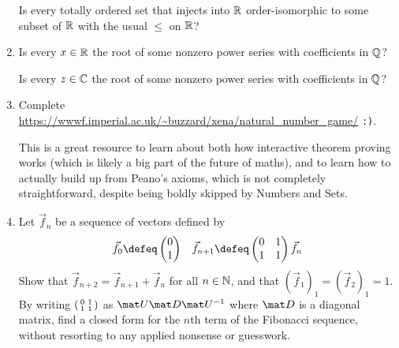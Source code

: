 \documentclass[a4paper,12pt]{article}
\begin{document}
\begin{enumerate}[leftmargin=*]
  Is every totally ordered set that injects into \(\mathbb R\) order-isomorphic to some
  subset of \(\mathbb R\) with the usual \(\le\) on \(\mathbb R\)?
 \item
  Is every \(x \in \mathbb R\) the root of some nonzero power series with coefficients
  in \(\mathbb Q\)?

  Is every \(z \in \mathbb C\) the root of some nonzero power series with coefficients
  in \(\mathbb Q\)?
 \item
  Complete \url{https://wwwf.imperial.ac.uk/~buzzard/xena/natural_number_game/}
  \texttt{:)}.

  This is a great resource to learn about both how interactive theorem proving
  works (which is likely a big part of the future of maths), and to learn how
  to actually build up from Peano's axioms, which is not completely
  straightforward, despite being boldly skipped by Numbers and Sets.
 \item
  Let \(\vec f_n\) be a sequence of vectors defined by
  \begin{align*}
   \vec f_0 \defeq
    \begin{pmatrix} 0 \\ 1 \end{pmatrix}
   &&
   \vec f_{n + 1} \defeq
    \begin{pmatrix} 0 & 1 \\ 1 & 1 \end{pmatrix}\vec f_n
  \end{align*}
  Show that
  \(\vec f_{n + 2} = \vec f_{n + 1} + \vec f_n\) for all
  \(n \in \mathbb N\), and that \((\vec f_1)_1 = (\vec f_2)_1 = 1\). By
  writing \(\begin{psmallmatrix} 0 & 1 \\ 1 & 1 \end{psmallmatrix}\) as
  \(\mat U \mat D \mat U^{-1}\) where \(\mat D\) is a diagonal matrix,
  find a closed form for the \(n\)th term of the Fibonacci sequence, without
  resorting to any applied nonsense or guesswork.
\end{enumerate}
\end{document}

